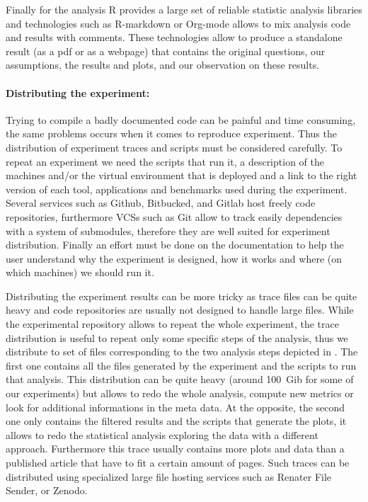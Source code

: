 Finally for the analysis \gls{R} provides a large set of reliable statistic
analysis libraries and technologies such as \gls{R-markdown} or
\gls{Org-mode} allows to mix analysis code and results with comments. These
technologies allow to produce a standalone result (as a pdf or as a webpage)
that contains the original questions, our assumptions, the results and plots,
and our observation on these results.

\paragraph{Distributing the experiment:}

Trying to compile a badly documented code can be painful and time consuming,
the same problems occurs when it comes to reproduce experiment. Thus the
distribution of experiment traces and scripts must be considered carefully.
To repeat an experiment we need the scripts that run it, a description of the
machines and/or the virtual environment that is deployed and a link to the
right version of each tool, applications and benchmarks used during the
experiment. Several services such as Github, Bitbucked, and Gitlab  host freely code repositories, furthermore \glspl{VCS} such as \gls{Git}
 allow to track easily dependencies with a system of
submodules, therefore they are well suited for experiment distribution.
Finally an effort must be done on the documentation to help the user
understand why the experiment is designed, how it works and where (on which
machines) we should run it.

Distributing the experiment results can be more tricky as trace files can be
quite heavy and code repositories are usually not designed to handle large
files. While the experimental repository allows to repeat the whole
experiment, the trace distribution is useful to repeat only some specific
steps of the analysis, thus we distribute to set of files corresponding to the
two analysis steps depicted in . The first one contains all
the files generated by the experiment and the scripts to run that analysis.
This distribution can be quite heavy (around \SI{100}{Gib} for some of our
experiments) but allows to redo the whole analysis, compute new metrics or
look for additional informations in the meta data. At the opposite, the second
one only contains the filtered results and the scripts that generate the
plots, it allows to redo the statistical analysis exploring the data with a
different approach. Furthermore this trace usually contains more plots and
data than a published article that have to fit a certain amount of pages. Such
traces can be distributed using specialized large file hosting services such
as Renater File Sender, or Zenodo.


